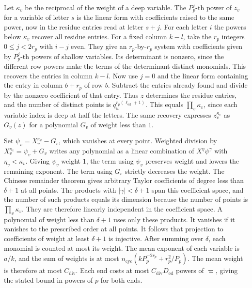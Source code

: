 Let \(\kappa_v\) be the reciprocal of the weight of a deep variable.
The \(P_p^j\)-th power of \(z_v\) for a variable of letter \(s\)
is the linear form with coefficients raised to the same power,
now in the residue entries read at letter \(s+j\).
For each letter \(i\) the powers below \(\kappa_v\) recover all
residue entries. For a fixed column \(k-l\), take the \(r_p\)
integers \(0\le j<2r_p\) with \(i-j\) even. They give an
\(r_p\)-by-\(r_p\) system with coefficients given by \(P_p^j\)-th
powers of shallow variables. Its determinant is nonzero, since
the different row powers make the terms of the determinant
distinct monomials. This recovers the entries in column \(k-l\).
Now use \(j=0\) and the linear form containing the entry in
column \(b+r_p\) of row \(b\). Subtract the entries already found
and divide by the nonzero coefficient of that entry.
Thus \(z\) determines the residue entries, and the number of
distinct points is \(q_w^{r_p(\ell_\mathrm{ed}+1)}\).
This equals \(\prod_v\kappa_v\), since each variable index is deep
at half the letters. The same recovery expresses \(z_v^{\kappa_v}\)
as \(G_v(z)\) for a polynomial \(G_v\) of weight less than \(1\).

Set \(\psi_v=X_v^{\kappa_v}-G_v\), which vanishes at every point.
Weighted division by \(X_v^{\kappa_v}=\psi_v+G_v\) writes any
polynomial as a linear combination of \(X^\eta\psi^\gamma\)
with \(\eta_v<\kappa_v\).
Giving \(\psi_v\) weight \(1\), the term using \(\psi_v\)
preserves weight and lowers the remaining exponent. The term
using \(G_v\) strictly decreases the weight.
The Chinese remainder theorem gives arbitrary Taylor coefficients
of degree less than \(\delta+1\) at all points. The products with
\(|\gamma|<\delta+1\) span this coefficient space, and the number
of such products equals its dimension because the number of
points is \(\prod_v\kappa_v\). They are therefore linearly
independent in the coefficient space.
A polynomial of weight less than \(\delta+1\) uses only these
products. It vanishes if it vanishes to the prescribed order at
all points.
It follows that projection to coefficients
of weight at least \(\delta+1\) is injective.
After summing over \(\delta\), each monomial is counted at most
its weight. The mean exponent of each variable is \(a/k\), and
the sum of weights is at most
\(n_\mathrm{cyc}(kP_p^{-2r_p}+r_p^2/P_p)\).
The mean weight is therefore at most \(C_{\mathrm{div}}\).
Each end costs at most \(C_{\mathrm{div}}D_\mathrm{ed}\) powers of
\(\varpi\), giving the stated bound in powers of \(p\) for both ends.


